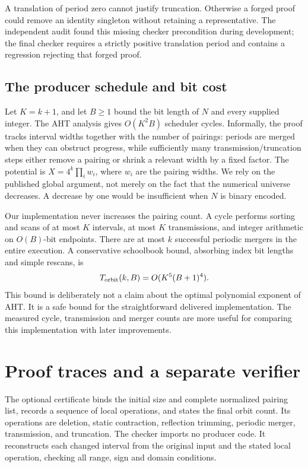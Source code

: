 \documentclass[11pt,a4paper]{article}
\theoremstyle{definition}\newtheorem{definition}[theorem]{Definition}
\theoremstyle{remark}\newtheorem{remark}[theorem]{Remark}
\begin{document}
A translation of period zero cannot justify truncation. Otherwise a forged
proof could remove an identity singleton without retaining a representative.
The independent audit found this missing checker precondition during
development; the final checker requires a strictly positive translation
period and contains a regression rejecting that forged proof.

\subsection{The producer schedule and bit cost}

Let $K=k+1$, and let $B\geq1$ bound the bit length of $N$ and every supplied
integer. The AHT analysis gives $O(K^2B)$ scheduler cycles. Informally, the
proof tracks interval widths together with the number of pairings: periods
are merged when they can obstruct progress, while sufficiently many
transmission/truncation steps either remove a pairing or shrink a relevant
width by a fixed factor. The potential is $X=4^k\prod_i w_i$, where
$w_i$ are the pairing widths. We rely on the published global
argument, not merely on the fact that the numerical universe decreases.
A decrease by one would be insufficient when $N$ is binary encoded.

Our implementation never increases the pairing count. A cycle performs
sorting and scans of at most $K$ intervals, at most $K$ transmissions, and
integer arithmetic on $O(B)$-bit endpoints. There are at most $k$ successful
periodic mergers in the entire execution. A conservative schoolbook bound,
absorbing index bit lengths and simple rescans, is
\begin{equation}\label{eq:aht-bound}
 T_{\rm orbit}(k,B)=O(K^5(B+1)^4).
\end{equation}
This bound is deliberately not a claim about the optimal polynomial exponent
of AHT. It is a safe bound for the straightforward delivered implementation.
The measured cycle, transmission and merger counts are more useful for
comparing this implementation with later improvements.

\section{Proof traces and a separate verifier}
\label{sec:verify}

The optional certificate binds the initial size and complete normalized
pairing list, records a sequence of local operations, and states the final
orbit count. Its operations are deletion, static contraction, reflection
trimming, periodic merger, transmission, and truncation. The checker imports
no producer code. It reconstructs each changed interval from the original
input and the stated local operation, checking all range, sign and domain
conditions.
\end{document}
